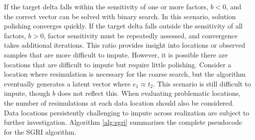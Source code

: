 If the target delta falls within the sensitivity of one or more factors, $b<0$, and the correct vector can be solved with binary search. In this scenario, solution polishing converges quickly. If the target delta falls outside the sensitivity of all factors, $b>0$, factor sensitivity must be repeatedly assessed, and convergence takes additional iterations. This ratio provides insight into locations or observed samples that are more difficult to impute. However, it is possible there are locations that are difficult to impute but require little polishing. Consider a location where resimulation is necessary for the coarse search, but the algorithm eventually generates a latent vector where $e_{1} \approx t_{2}$. This scenario is still difficult to impute, though $b$ does not reflect this. When evaluating problematic locations, the number of resimulations at each data location should also be considered. Data locations persistently challenging to impute across realization are subject to further investigation. Algorithm \ref{alg:sgri} summarizes the complete pseudocode for the \gls{SGRI} algorithm.

